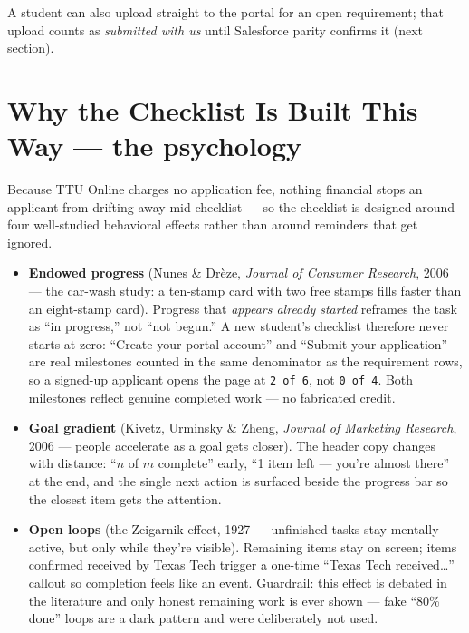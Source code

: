 \documentclass[11pt,letterpaper]{report}
\begin{document}
A student can also upload straight to the portal for an open requirement; that
upload counts as \emph{submitted with us} until Salesforce parity confirms it
(next section).

\section{Why the Checklist Is Built This Way --- the psychology}

Because TTU Online charges no application fee, nothing financial stops an
applicant from drifting away mid-checklist --- so the checklist is designed
around four well-studied behavioral effects rather than around reminders that
get ignored.

\begin{itemize}[leftmargin=1.4em]
  \item \textbf{Endowed progress} (Nunes \& Dr\`eze, \emph{Journal of Consumer
        Research}, 2006 --- the car-wash study: a ten-stamp card with two free
        stamps fills faster than an eight-stamp card). Progress that
        \emph{appears already started} reframes the task as ``in progress,''
        not ``not begun.'' A new student's checklist therefore never starts at
        zero: ``Create your portal account'' and ``Submit your application''
        are real milestones counted in the same denominator as the requirement
        rows, so a signed-up applicant opens the page at \texttt{2 of 6}, not
        \texttt{0 of 4}. Both milestones reflect genuine completed work --- no
        fabricated credit.
  \item \textbf{Goal gradient} (Kivetz, Urminsky \& Zheng, \emph{Journal of
        Marketing Research}, 2006 --- people accelerate as a goal gets closer).
        The header copy changes with distance: ``$n$ of $m$ complete'' early,
        ``1 item left --- you're almost there'' at the end, and the single next
        action is surfaced beside the progress bar so the closest item gets the
        attention.
  \item \textbf{Open loops} (the Zeigarnik effect, 1927 --- unfinished tasks
        stay mentally active, but only while they're visible). Remaining items
        stay on screen; items confirmed received by Texas Tech trigger a
        one-time ``Texas Tech received\ldots'' callout so completion feels like
        an event. Guardrail: this effect is debated in the literature and only
        honest remaining work is ever shown --- fake ``80\% done'' loops are a
        dark pattern and were deliberately not used.

\end{itemize}
\end{document}
